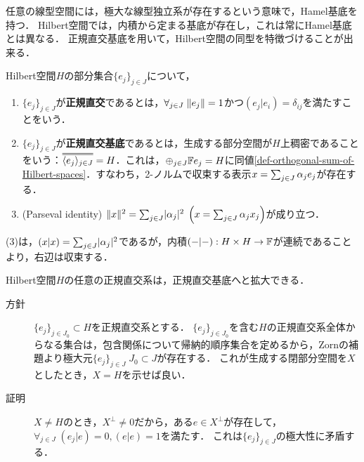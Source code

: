 \documentclass[uplatex,dvipdfmx]{jsreport}
\begin{document}
\begin{tcolorbox}[colframe=ForestGreen, colback=ForestGreen!10!white,breakable,colbacktitle=ForestGreen!40!white,coltitle=black,fonttitle=\bfseries\sffamily,
title=]
    任意の線型空間には，極大な線型独立系が存在するという意味で，Hamel基底を持つ．
    Hilbert空間では，内積から定まる基底が存在し，これは常にHamel基底とは異なる．
    正規直交基底を用いて，Hilbert空間の同型を特徴づけることが出来る．
\end{tcolorbox}

\begin{definition}
    Hilbert空間$H$の部分集合$\{e_j\}_{j\in J}$について，
    \begin{enumerate}
        \item $\{e_j\}_{j\in J}$が\textbf{正規直交}であるとは，$\forall_{j\in J}\;\|e_j\|=1$かつ$(e_j|e_i)=\delta_{ij}$を満たすことをいう．
        \item $\{e_j\}_{j\in J}$が\textbf{正規直交基底}であるとは，生成する部分空間が$H$上稠密であることをいう：$\dbloverline{\brac{e_j}_{j\in J}}=H$．これは，$\oplus_{j\in J}\mathbb{F} e_j=H$に同値\ref{def-orthogonal-sum-of-Hilbert-spaces}．すなわち，2-ノルムで収束する表示$x=\sum_{j\in J}\alpha_j e_j$が存在する．
        \item (Parseval identity) $\|x\|^2=\sum_{j\in J}\lvert\alpha_j\rvert^2\;\left(x=\sum_{j\in J}\alpha_jx_j\right)$が成り立つ．
    \end{enumerate}
\end{definition}
\begin{Proof}
    (3)は，$(x|x)=\sum_{j\in J}\lvert\alpha_j\rvert^2$であるが，内積$(-|-):H\times H\to\mathbb{F}$が連続であることより，右辺は収束する．
\end{Proof}

\begin{proposition}
    Hilbert空間$H$の任意の正規直交系は，正規直交基底へと拡大できる．
\end{proposition}
\begin{Proof}\mbox{}
    \begin{description}
        \item[方針] $\{e_j\}_{j\in J_0}\subset H$を正規直交系とする．
        $\{e_j\}_{j\in J_0}$を含む$H$の正規直交系全体からなる集合は，包含関係について帰納的順序集合を定めるから，Zornの補題より極大元$\{e_j\}_{j\in J}\;J_0\subset J$が存在する．
        これが生成する閉部分空間を$X$としたとき，$X=H$を示せば良い．
        \item[証明] 
        $X\ne H$のとき，$X^\perp\ne 0$だから，ある$e\in X^\perp$が存在して，$\forall_{j\in J}\;(e_j|e)=0,(e|e)=1$を満たす．
        これは$\{e_j\}_{j\in J}$の極大性に矛盾する．
    \end{description}
\end{Proof}
\end{document}
